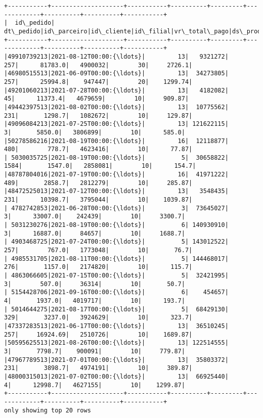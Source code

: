 \documentclass[11pt]{article}
\begin{document}
    \begin{Verbatim}[commandchars=\\\{\}]
+-----------+--------------------+-----------+----------+---------+-------------+----------+----------+-----------+
|  id\_pedido|           dt\_pedido|id\_parceiro|id\_cliente|id\_filial|vr\_total\_pago|ds\_produto|quantidade|vr\_unitario|
+-----------+--------------------+-----------+----------+---------+-------------+----------+----------+-----------+
|49910739213|2021-08-12T00:00:{\ldots}|         13|   9321272|      257|      81783.0|   4900032|        30|     2726.1|
|46980515513|2021-06-09T00:00:{\ldots}|         13|  34273805|      257|      25994.8|    947447|        20|    1299.74|
|49201060213|2021-07-28T00:00:{\ldots}|         13|   4182082|       45|      11373.4|   4679659|        10|     909.87|
|49442397513|2021-08-02T00:00:{\ldots}|         13|  10775562|      231|       1298.7|   1082672|        10|     129.87|
|49096084213|2021-07-25T00:00:{\ldots}|         13| 121622115|        3|       5850.0|   3806899|        10|      585.0|
|50278586216|2021-08-19T00:00:{\ldots}|         16|  12118877|      480|        778.7|   4623416|        10|      77.87|
| 5030035725|2021-08-19T00:00:{\ldots}|          5|  30658822|     1584|       1547.0|   2858081|        10|      154.7|
|48787804016|2021-07-19T00:00:{\ldots}|         16|  41971222|      489|       2858.7|   2812279|        10|     285.87|
|48472525013|2021-07-12T00:00:{\ldots}|         13|   3548435|      231|      10398.7|   3795044|        10|    1039.87|
| 4782742853|2021-06-28T00:00:{\ldots}|          3|  73645027|        3|      33007.0|    242439|        10|     3300.7|
| 5031230276|2021-08-19T00:00:{\ldots}|          6| 140930910|        3|      16887.0|     84657|        10|     1688.7|
| 4903468725|2021-07-24T00:00:{\ldots}|          5| 143012522|      257|        767.0|   1773048|        10|       76.7|
| 4985531705|2021-08-11T00:00:{\ldots}|          5| 144468017|      276|       1157.0|   2174820|        10|      115.7|
| 4863066605|2021-07-15T00:00:{\ldots}|          5|  32421995|        3|        507.0|     36314|        10|       50.7|
| 5154428706|2021-09-16T00:00:{\ldots}|          6|    454657|        4|       1937.0|   4019717|        10|      193.7|
| 5014644275|2021-08-17T00:00:{\ldots}|          5|  68429130|      329|       3237.0|   3924629|        10|      323.7|
|47337283513|2021-06-17T00:00:{\ldots}|         13|  36510245|      257|     16924.69|   2510726|        10|    1689.87|
|50595625513|2021-08-26T00:00:{\ldots}|         13| 122514555|        3|       7798.7|    900091|        10|     779.87|
|47967789513|2021-07-01T00:00:{\ldots}|         13|  35803372|      231|       3898.7|   4974191|        10|     389.87|
|48000315013|2021-07-02T00:00:{\ldots}|         13|  66925440|        4|      12998.7|   4627155|        10|    1299.87|
+-----------+--------------------+-----------+----------+---------+-------------+----------+----------+-----------+
only showing top 20 rows


    \end{Verbatim}
\end{document}
